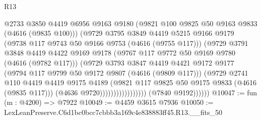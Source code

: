 \begin{lexlean}{R13}
\begin{coremodule}
                                      @2733
                                      @3850
                                      @4419
                                      @6956
                                      @9163
                                      @9180
                                      (@9821 @100 @9825 @50 @9163 @9833 (@4616 (@9835 @100)))
                                      (@9729
                                        @3795
                                        @3849
                                        @4419
                                        @5215
                                        @9166
                                        @9179
                                        (@9738 @117 @9743 @50 @9166 @9753 (@4616 (@9755 @117)))
                                        (@9729
                                          @3791
                                          @3848
                                          @4419
                                          @4422
                                          @9169
                                          @9178
                                          (@9767 @117 @9772 @50 @9169 @9780 (@4616 (@9782 @117)))
                                          (@9729
                                            @3793
                                            @3847
                                            @4419
                                            @4421
                                            @9172
                                            @9177
                                            (@9794 @117 @9799 @50 @9172 @9807 (@4616 (@9809 @117)))
                                            (@9729
                                              @2741
                                              @110
                                              @4419
                                              @4419
                                              @9175
                                              @4189
                                              (@9821
                                                @117
                                                @9825
                                                @50
                                                @9175
                                                @9833
                                                (@4616 (@9835 @117)))
                                              (@4636 @9720)))))))))))))))))
              (@7840 @9192))))))
@10047 := fun (m : @4200) => @7922
@10049 := @4459 @3615 @7936
@10050 := LexLeanPreserve.C6d1bc0bcc7cbbb3a169c4e838883ff45.R13.__fits_50

\end{coremodule}
\end{lexlean}
